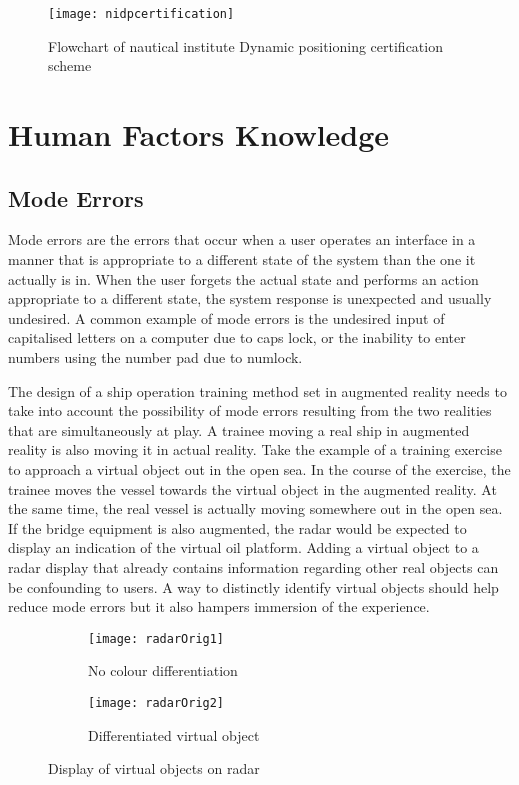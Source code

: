 \begin{figure}
	\centering
	\texttt{[image: nidpcertification]}
	\caption{Flowchart of nautical institute Dynamic positioning certification scheme}
	\label{fig:nidpcertification}
\end{figure} 

\section{Human Factors Knowledge}
\label{sec:humanfactors}
\subsection{Mode Errors}
Mode errors are the errors that occur when a user operates an interface in a manner that is appropriate to a different state of the system than the one it actually is in. When the user forgets the actual state and performs an action appropriate to a different state, the system response is unexpected and usually undesired. A common example of mode errors is the undesired input of capitalised letters on a computer due to caps lock, or the inability to enter numbers using the number pad due to numlock. 

The design of a ship operation training method set in augmented reality needs to take into account the possibility of mode errors resulting from the two realities that are simultaneously at play. A trainee moving a real ship in augmented reality is also moving it in actual reality. Take the example of a training exercise to approach a virtual object out in the open sea. In the course of the exercise, the trainee moves the vessel towards the virtual object in the augmented reality. At the same time, the real vessel is actually moving somewhere out in the open sea. If the bridge equipment is also augmented, the radar would be expected to display an indication of the virtual oil platform. Adding a virtual object to a radar display that already contains information regarding other real objects can be confounding to users. A way to distinctly identify virtual objects should help reduce mode errors but it also hampers immersion of the experience. 

\begin{figure}[ht]
    \centering
    \begin{subfigure}[b]{0.45\textwidth}
        \centering
        \texttt{[image: radarOrig1]}
        \caption{No colour differentiation}
        \label{fig:three sin x}
    \end{subfigure}
    \hfill
    \begin{subfigure}[b]{0.45\textwidth}
        \centering
        \texttt{[image: radarOrig2]}
        \caption{Differentiated virtual object}
        \label{fig:five over x}
    \end{subfigure}
    \caption{Display of virtual objects on radar}
    \label{fig:three graphs}
\end{figure}

